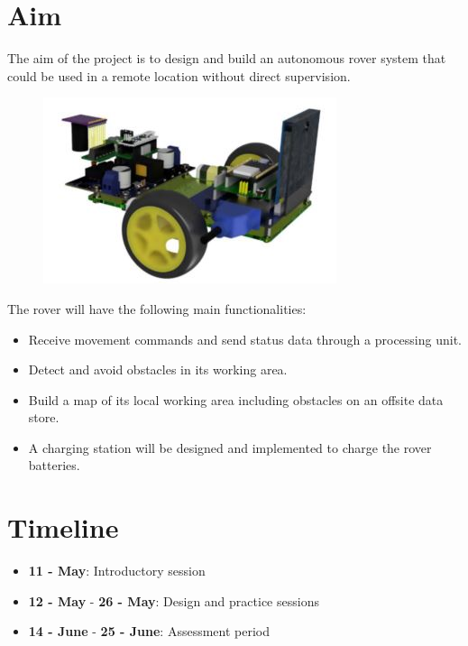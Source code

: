 \documentclass[10pt, a4paper]{article}
\begin{document}
\section{Aim}

The aim of the project is to design and build an autonomous rover system that could be used in a remote location without direct supervision. 

\begin{figure} [h!]
    \centering
    \includegraphics[scale=0.8]{Rover.JPG}
\end{figure}


The rover will have the following main functionalities:
\begin{itemize}
    \item Receive movement commands and send status data through a processing unit.
    \item Detect and avoid obstacles in its working area.
    \item Build a map of its local working area including obstacles on an offsite data store.
    \item A charging station will be designed and implemented to charge the rover batteries.
\end{itemize}

\section{Timeline}

\begin{itemize}
    \item \textbf{11 - May}: Introductory session
    \item \textbf{12 - May} - \textbf{26 - May}: Design and practice sessions 
    \item \textbf{14 - June} - \textbf{25 - June}: Assessment period 
\end{itemize}
\end{document}

